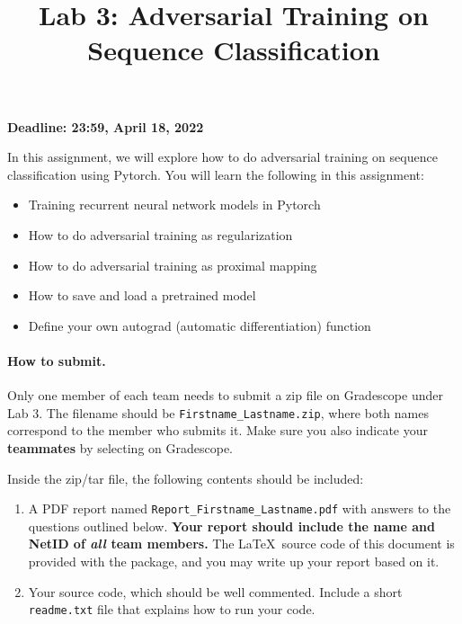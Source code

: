 \documentclass[11pt]{report}
\title{Lab 3: Adversarial Training on Sequence Classification}
\begin{document}
\maketitle

{\bf Deadline: 23:59, April 18, 2022}

In this assignment, we will explore how to do adversarial training on sequence classification using Pytorch. You will learn the following in this assignment:

\vspace{-0.9em}
\begin{itemize}
\item Training recurrent neural network models in Pytorch

\item How to do adversarial training as regularization

\item How to do adversarial training as proximal mapping

\item How to save and load a pretrained model

\item Define your own autograd (automatic differentiation) function
\end{itemize}
\vspace{-0.8em}

\paragraph{How to submit.}

Only one member of each team needs to submit a zip file on Gradescope under Lab 3.
The filename should be \verb#Firstname_Lastname.zip#,
where both names correspond to the member who submits it.
Make sure you also indicate your \textbf{teammates} by selecting on Gradescope.

Inside the zip/tar file, the following contents should be included:
\vspace{-1em}
\begin{enumerate}
	
	\item  A PDF report named \verb#Report_Firstname_Lastname.pdf# with answers to the questions outlined below.
	{\bf Your report should include the name and NetID of \emph{all} team members.}
	The \LaTeX\ source code of this document is provided with the package, and
	you may write up your report based on it.
	\item Your source code, which should be well commented.
	Include a short \verb#readme.txt# file that explains how to run your code.
\end{enumerate}
\vspace{-1em}
\end{document}
